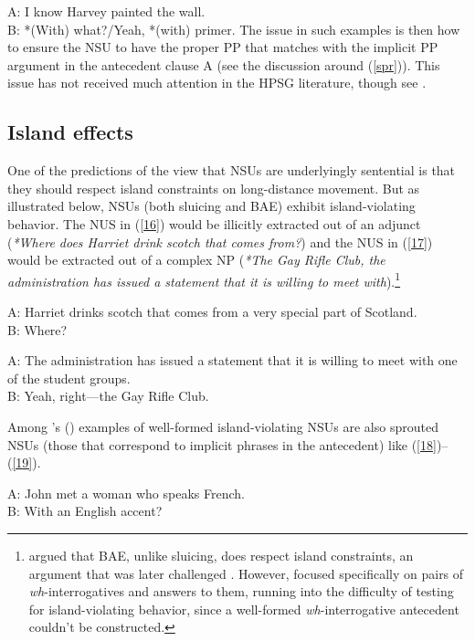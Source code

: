{\ea A: I know Harvey painted the wall.\\B: *(With) what?/Yeah, *(with) primer.\label{15}\z
%
The issue in such examples is then how to ensure
the NSU to have the proper PP that matches with the implicit PP argument in 
the antecedent clause A (see the discussion
around (\ref{spr})). This issue has not received much attention in the HPSG literature, though see \citet{Kim2015}.



\subsection{Island effects}
\label{sec-island-effects}

One of the predictions of the view that NSUs are underlyingly sentential is that they should respect island constraints on long-distance movement. But as illustrated below, NSUs (both sluicing and BAE) exhibit island-violating behavior. The NUS in (\ref{16}) would be illicitly extracted out of an adjunct (\textit{*Where does Harriet drink scotch that comes from?}) and the NUS in (\ref{17}) would be extracted out of a complex NP (\textit{*The Gay Rifle Club, the administration has issued a statement that it is willing to meet with}).\footnote{\citet{Merchant2005a} argued that BAE, unlike sluicing, does respect island constraints, an argument that was later challenged \citep[see e.g,][]{CJ2005a, Griffiths2014}. However, \citet{Merchant2005-proc} focused specifically on pairs of \emph{wh}-interrogatives and answers to them, running into the difficulty of testing for island-violating behavior, since a well-formed \emph{wh}-interrogative antecedent couldn't be constructed.}

\ea A: Harriet drinks scotch that comes from a very special part of Scotland.\\B: Where? \citep[245]{CJ2005a} \label{16}\z

\ea A: The administration has issued a statement that it is willing to meet with one of the student groups.\\B: Yeah, right---the Gay Rifle Club. \citep[245]{CJ2005a} \label{17}\z

Among \citeauthor{CJ2005a}'s (\citeyear[245]{CJ2005a}) examples of well-formed island-violating NSUs are also sprouted NSUs (those that correspond to implicit phrases in the antecedent) like (\ref{18})--(\ref{19}).

\ea A: John met a woman who speaks French.\\B: With an English accent?\label{18}\z

}
